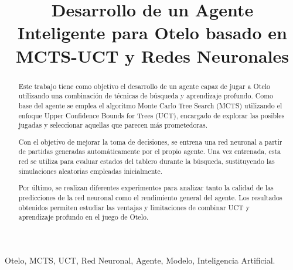 \documentclass[conference,a4paper]{IEEEtran}
\begin{document}
\title{Desarrollo de un Agente Inteligente para Otelo basado en MCTS-UCT y Redes Neuronales} 

\author{
  
  \and
  
}

\maketitle

\begin{abstract}
  Este trabajo tiene como objetivo el desarrollo de un agente capaz de jugar a Otelo utilizando una combinación de técnicas de búsqueda y aprendizaje profundo. 
Como base del agente se emplea el algoritmo Monte Carlo Tree Search (MCTS) utilizando el enfoque Upper Confidence Bounds for Trees (UCT), encargado de explorar las posibles jugadas y seleccionar aquellas que parecen más prometedoras. 

Con el objetivo de mejorar la toma de decisiones, se entrena una red neuronal a partir de partidas generadas automáticamente por el propio agente. 
Una vez entrenada, esta red se utiliza para evaluar estados del tablero durante la búsqueda, sustituyendo las simulaciones aleatorias empleadas inicialmente. 

Por último, se realizan diferentes experimentos para analizar tanto la calidad de las predicciones de la red neuronal como el rendimiento general del agente. 
Los resultados obtenidos permiten estudiar las ventajas y limitaciones de combinar UCT y aprendizaje profundo en el juego de Otelo. 
\end{abstract}

\begin{IEEEkeywords}
  Otelo, MCTS, UCT, Red Neuronal, Agente, Modelo, Inteligencia Artificial. 
\end{IEEEkeywords}
\end{document}
